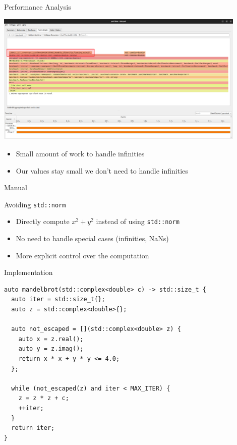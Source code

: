 \documentclass{beamer}
\begin{document}
\begin{frame}{Performance Analysis}
    \begin{center}
        \includegraphics[width=0.9\textwidth]{images/V2_perf.png}
    \end{center}
    \begin{itemize}
        \item Small amount of work to handle infinities
        \item Our values stay small we don't need to handle infinities
    \end{itemize}
\end{frame}

\begin{frame}[fragile]{Manual}
    \begin{block}{Avoiding \texttt{std::norm}}
        \begin{itemize}
            \item Directly compute $x^2 + y^2$ instead of using \texttt{std::norm}
            \item No need to handle special cases (infinities, NaNs)
            \item More explicit control over the computation
        \end{itemize}
    \end{block}

    \begin{exampleblock}{Implementation}
        \begin{verbatim}
auto mandelbrot(std::complex<double> c) -> std::size_t {
  auto iter = std::size_t{};
  auto z = std::complex<double>{};

  auto not_escaped = [](std::complex<double> z) {
    auto x = z.real();
    auto y = z.imag();
    return x * x + y * y <= 4.0;
  };

  while (not_escaped(z) and iter < MAX_ITER) {
    z = z * z + c;
    ++iter;
  }
  return iter;
}
        \end{verbatim}
    \end{exampleblock}
\end{frame}
\end{document}
